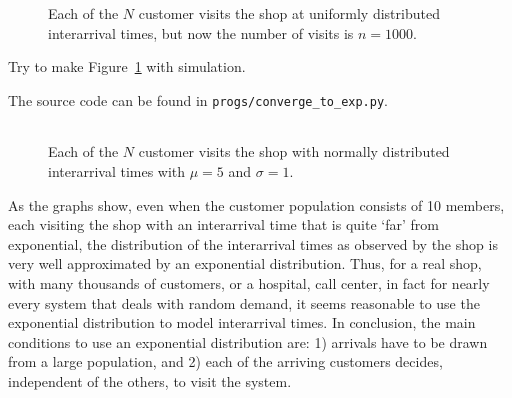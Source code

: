 \begin{figure}[ht]
  \centering
  \begin{tabular}[h]{c}
 \\
  \end{tabular}
  \caption{Each of the $N$ customer visits the shop at uniformly 
    distributed interarrival times, but now the number of visits is
    $n=1000$.}  
  \label{fig:uniformmany}
\end{figure}

\begin{exercise}
  Try to make Figure~\ref{fig:uniformmany} with simulation.
  \begin{solution}
    The source code can be found in \texttt{progs/converge\_to\_exp.py}.
\end{solution}
\end{exercise}

\begin{figure}[ht]
  \centering
  \begin{tabular}[h]{c}
 
  \end{tabular}
  \caption{Each of the $N$ customer visits the shop with normally
    distributed interarrival times with $\mu=5$ and
    $\sigma=1$.}  \label{fig:normal}
\end{figure}

As the graphs show, even when the customer population consists of 10
members, each visiting the shop with an interarrival time that is
quite `far' from exponential, the distribution of the interarrival
times as observed by the shop is very well approximated by an
exponential distribution. Thus, for a real shop, with many thousands
of customers, or a hospital, call center, in fact for nearly every
system that deals with random demand, it seems reasonable to use the
exponential distribution to model interarrival times.  In conclusion,
the main conditions to use an exponential distribution are: 1)
arrivals have to be drawn from a large population, and 2) each of the
arriving customers decides, independent of the others, to visit the
system.






